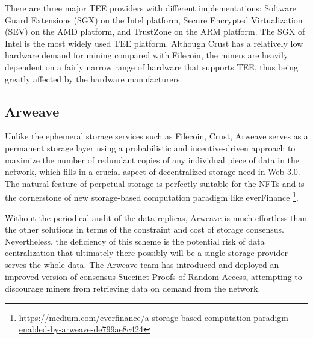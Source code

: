 \documentclass[]{article}
\begin{document}
There are three major TEE providers with different implementations: Software Guard Extensions (SGX) on the Intel platform, Secure Encrypted Virtualization (SEV) on the AMD platform, and TrustZone on the ARM platform. The SGX of Intel is the most widely used TEE platform. Although Crust has a relatively low hardware demand for mining compared with Filecoin, the miners are heavily dependent on a fairly narrow range of hardware that supports TEE, thus being greatly affected by the hardware manufacturers.



\subsection{Arweave}

Unlike the ephemeral storage services such as Filecoin, Crust, Arweave\cite{arweave} serves as a permanent storage layer using a probabilistic and incentive-driven approach to maximize the number of redundant copies of any individual piece of data in the network, which fills in a crucial aspect of decentralized storage need in Web 3.0. The natural feature of perpetual storage is perfectly suitable for the NFTs and is the cornerstone of new storage-based computation paradigm like everFinance \footnote{\url{https://medium.com/everfinance/a-storage-based-computation-paradigm-enabled-by-arweave-de799ae8c424}}.

Without the periodical audit of the data replicas, Arweave is much effortless than the other solutions in terms of the constraint and cost of storage consensus. Nevertheless, the deficiency of this scheme is the potential risk of data centralization that ultimately there possibly will be a single storage provider serves the whole data. The Arweave team has introduced and deployed an improved version of consensus Succinct Proofs of Random Access, attempting to discourage miners from retrieving data on demand from the network.


\end{document}
